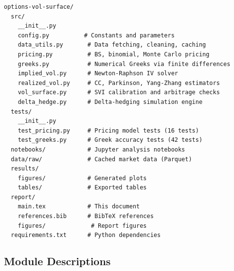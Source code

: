 \documentclass[11pt,a4paper]{article}
\begin{document}
\begin{appendices}
\begin{lstlisting}[language={},basicstyle=\ttfamily\footnotesize,frame=none,numbers=none]
options-vol-surface/
  src/
    __init__.py
    config.py          # Constants and parameters
    data_utils.py       # Data fetching, cleaning, caching
    pricing.py          # BS, binomial, Monte Carlo pricing
    greeks.py           # Numerical Greeks via finite differences
    implied_vol.py      # Newton-Raphson IV solver
    realized_vol.py     # CC, Parkinson, Yang-Zhang estimators
    vol_surface.py      # SVI calibration and arbitrage checks
    delta_hedge.py      # Delta-hedging simulation engine
  tests/
    __init__.py
    test_pricing.py     # Pricing model tests (16 tests)
    test_greeks.py      # Greek accuracy tests (42 tests)
  notebooks/            # Jupyter analysis notebooks
  data/raw/             # Cached market data (Parquet)
  results/
    figures/            # Generated plots
    tables/             # Exported tables
  report/
    main.tex            # This document
    references.bib      # BibTeX references
    figures/             # Report figures
  requirements.txt      # Python dependencies
\end{lstlisting}

\subsection{Module Descriptions}


\end{appendices}
\end{document}
